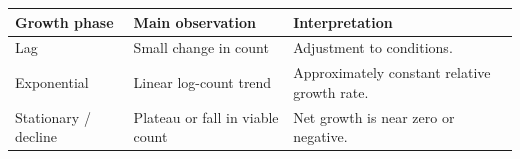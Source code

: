 \documentclass[12pt,a4paper]{article}
\begin{document}
\begin{tcolorbox}[tikzbox, title={Summary Comparison}]
\par\vspace{5pt}
\begingroup
\setlength{\extrarowheight}{1pt}
\noindent\begin{tabularx}{\linewidth}{|B{3.45cm}|Y|Y|}
\hline
\textbf{Growth phase} & \textbf{Main observation} & \textbf{Interpretation} \\ \hline
Lag & Small change in count & Adjustment to conditions. \\ \hline
Exponential & Linear log-count trend & Approximately constant relative growth rate. \\ \hline
Stationary / decline & Plateau or fall in viable count & Net growth is near zero or negative. \\ \hline
\end{tabularx}\par
\endgroup
\end{tcolorbox}
\end{document}

